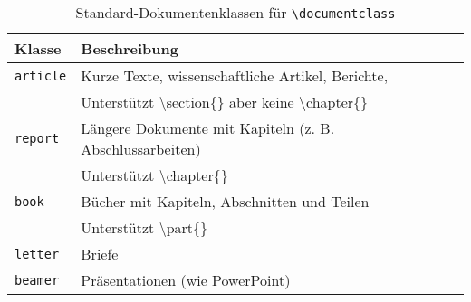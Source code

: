 \begin{table}[h]
    \centering
    \begin{tabular}{ll}
        \toprule
        \textbf{Klasse}  & \textbf{Beschreibung}                                                         \\
        \midrule
        \texttt{article} & Kurze Texte, wissenschaftliche Artikel, Berichte,                             \\
                         & Unterstützt \textbackslash section\{\}  aber keine \textbackslash chapter\{\} \\
        \texttt{report}  & Längere Dokumente mit Kapiteln (z. B. Abschlussarbeiten)                      \\
                         & Unterstützt \textbackslash chapter\{\}                                        \\
        \texttt{book}    & Bücher mit Kapiteln, Abschnitten und Teilen                                   \\
                         & Unterstützt \textbackslash part\{\}                                           \\
        \texttt{letter}  & Briefe                                                                        \\

        \texttt{beamer}  & Präsentationen (wie PowerPoint)                                               \\
        \bottomrule
    \end{tabular}
    \caption{Standard-Dokumentenklassen für \texttt{\textbackslash documentclass}}
    \label{tab:dokumentklassen}
\end{table}